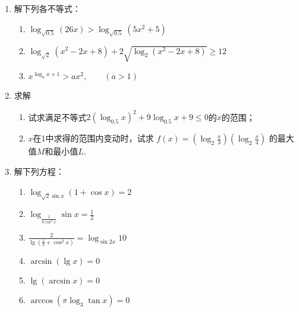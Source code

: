 \begin{enumerate}
\item 解下列各不等式：
\begin{enumerate}
\item $\log_{\sqrt{0.5}}(26x)>\log_{\sqrt{0.5}}(5x^2+5)$
\item $\log_{\sqrt{2}}(x^2-2x+8)+2\sqrt{\log_2(x^2-2x+8)}\ge 12$
\item $x^{\log_a x+1}>ax^2,\qquad (a>1)$
\end{enumerate}

\item 求解
\begin{enumerate}
  \item 试求满足不等式$2(\log_{0.5}x)^2+9\log_{0.5}x+9\le 0$的$x$的范围；
  \item $x$在1中求得的范围内变动时，试求
$f(x)=\left(\log_2 \frac{x}{3}\right)\left(\log_2 \frac{x}{4}\right)$
的最大值$M$和最小值$L$.
\end{enumerate}

\item 解下列方程：
\begin{multicols}{2}
  \begin{enumerate}
  \item $\log_{\sqrt{2}\sin x}(1+\cos x)=2$
  \item $\log_{\tfrac{1}{8\cos^2 x}}\sin x=\frac{1}{2}$
  \item $\frac{2}{\lg\left(\frac{1}{2}+\cos^2 x\right)}=\log_{\sin 2x}10$
  \item $\arcsin(\lg x)=0$
  \item $\lg(\arcsin x)=0$
  \item $\arccos(\pi\log_3\tan x)=0$
\end{enumerate}
\end{multicols}

\end{enumerate}